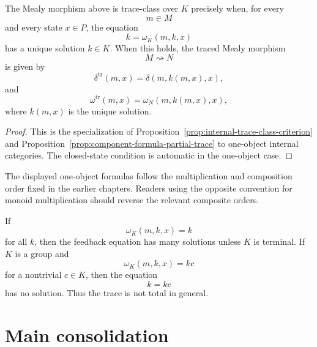 \begin{proposition}
\label{prop:one-object-trace-criterion}
The Mealy morphism above is trace-class over \(K\) precisely when, for every
\[
m\in M
\]
and every state \(x\in P\), the equation
\[
k=\omega_K(m,k,x)
\]
has a unique solution \(k\in K\).
When this holds, the traced Mealy morphism
\[
M\rightsquigarrow N
\]
is given by
\[
\delta^{\operatorname{tr}}(m,x)
=
\delta(m,k(m,x),x),
\]
and
\[
\omega^{\operatorname{tr}}(m,x)
=
\omega_N(m,k(m,x),x),
\]
where \(k(m,x)\) is the unique solution.
\end{proposition}

\begin{proof}
This is the specialization of
Proposition~\ref{prop:internal-trace-class-criterion} and
Proposition~\ref{prop:component-formula-partial-trace} to one-object internal
categories.  The closed-state condition is automatic in the one-object case.
\end{proof}

\begin{remark}
\label{rem:one-object-trace-order}
The displayed one-object formulas follow the multiplication and composition
order fixed in the earlier chapters.  Readers using the opposite convention
for monoid multiplication should reverse the relevant composite orders.
\end{remark}

\begin{remark}
\label{rem:genuine-partiality-one-object}
If
\[
\omega_K(m,k,x)=k
\]
for all \(k\), then the feedback equation has many solutions unless \(K\) is
terminal.  If \(K\) is a group and
\[
\omega_K(m,k,x)=kc
\]
for a nontrivial \(c\in K\), then the equation
\[
k=kc
\]
has no solution.  Thus the trace is not total in general.
\end{remark}

\section{Main consolidation}
\label{sec:partial-trace-main-consolidation}

